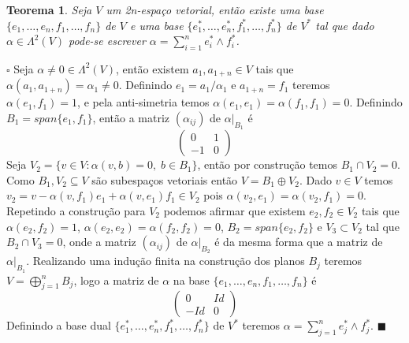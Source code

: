\documentclass[12pt]{book}
\newtheorem{teorema}{Teorema}[section]
\newenvironment{prova}[1]{$\square$ #1}{\hfill$\blacksquare$}
\begin{document}
	\begin{teorema}
		Seja $V$ um 2n-espaço vetorial, então existe uma base $\{ e_{1},\dots, e_{n}, f_{1},\dots, f_{n}\}$ de $V$ e uma base $\{e_{1}^{*}, \dots, e_{n}^{*}, f_{1}^{*}, \dots,f_{n}^{*}\}$ de $V^{*}$ tal que dado $\alpha \in \Lambda^{2}(V)$ pode-se escrever $\alpha = \sum_{i=1}^{n} e^{*}_{i}\wedge f^{*}_{i}$.
	\end{teorema}
	\begin{prova}
		Seja $\alpha\neq 0\in \Lambda^{2}(V) $, então existem $ a_{1}, a_{1+n} \in V $ tais que $\alpha(a_{1}, a_{1+n}) = \alpha_{1} \neq 0$. Definindo $e_{1} = a_{1}/\alpha_{1}$ e $a_{1+n} = f_{1}$ teremos $\alpha(e_{1}, f_{1}) = 1$, e pela anti-simetria temos $\alpha(e_{1}, e_{1}) = \alpha(f_{1}, f_{1}) = 0$. Definindo $B_{1}=span \{e_{1}, f_{1}\}$, então a matriz $(\alpha_{ij})$ de $\alpha|_{B_{1}}$ é
		$$
		\left(
		\begin{array}{cc}
		0 & 1
		\\
		-1 & 0
		\end{array}
		\right)
		$$
		Seja  $V_{2} = \{v \in V: \alpha(v, b) = 0,\; b \in B_{1}\}$, então por construção temos $B_{1} \cap V_{2} = 0$. Como $B_{1}, V_{2} \subseteq V$ são subespaços vetoriais então $V = B_{1}\oplus V_{2}$. Dado $v \in V$ temos $v_{2} =v- \alpha(v,f_{1})e_{1} +\alpha(v,e_{1})f_{1} \in V_{2}$ pois $\alpha(v_{2}, e_{1}) = \alpha(v_{2}, f_{1}) = 0$. Repetindo a construção para $V_{2}$ podemos afirmar que existem $e_{2}, f_{2} \in V_{2}$ tais que $\alpha(e_{2}, f_{2}) = 1$, $\alpha(e_{2}, e_{2}) = \alpha(f_{2}, f_{2}) = 0$, $B_{2} = span\{e_{2}, f_{2} \}$ e $V_{3} \subset V_{2}$ tal que $B_{2}\cap V_{3}=0$, onde a matriz $(\alpha_{ij})$ de $\alpha|_{B_{2}}$ é da mesma forma que a matriz de $\alpha|_{B_{1}}$. Realizando uma indução finita na construção dos planos $B_{j}$ teremos $V = \bigoplus_{j=1}^{n}B_{j}$, logo a matriz de $\alpha$ na base  $\{ e_{1},\dots, e_{n}, f_{1},\dots, f_{n}\}$ é
		$$
		\left(
		\begin{array}{cc}
		0 & Id
		\\
		-Id & 0
		\end{array}
		\right)
		$$
		Definindo a base dual $\{e_{1}^{*}, \dots, e_{n}^{*}, f_{1}^{*}, \dots,f_{n}^{*}\}$ de $V^{*}$ teremos $\alpha = \sum_{j=1}^{n}e_{j}^{*}\wedge f_{j}^{*}$.
	\end{prova}
	
\end{document}

